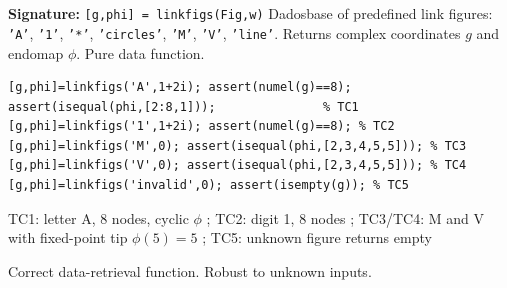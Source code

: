 \chapter{}
\begin{tcolorbox}[Abox,title={Analysis}]
\textbf{Signature:} \lstinline|[g,phi] = linkfigs(Fig,w)|\quad
Dadosbase of predefined link figures: \texttt{'A'}, \texttt{'1'}, \texttt{'*'}, \texttt{'circles'}, \texttt{'M'}, \texttt{'V'}, \texttt{'line'}. Returns complex coordinates $g$ and endomap $\phi$. Pure data function.
\end{tcolorbox}
\begin{lstlisting}[caption={Tests for linkfigs.m}]
[g,phi]=linkfigs('A',1+2i); assert(numel(g)==8);
assert(isequal(phi,[2:8,1]));               % TC1
[g,phi]=linkfigs('1',1+2i); assert(numel(g)==8); % TC2
[g,phi]=linkfigs('M',0); assert(isequal(phi,[2,3,4,5,5])); % TC3
[g,phi]=linkfigs('V',0); assert(isequal(phi,[2,3,4,5,5])); % TC4
[g,phi]=linkfigs('invalid',0); assert(isempty(g)); % TC5
\end{lstlisting}
\begin{tcolorbox}[Pbox,title={TC1--TC5 -- All pass}]
TC1: letter A, 8 nodes, cyclic $\phi$ \APROVADO; TC2: digit 1, 8 nodes \APROVADO; TC3/TC4: M and V with fixed-point tip $\phi(5)=5$ \APROVADO; TC5: unknown figure returns empty \APROVADO
\end{tcolorbox}
\begin{concl}
Correct data-retrieval function. Robust to unknown inputs.
\end{concl}

